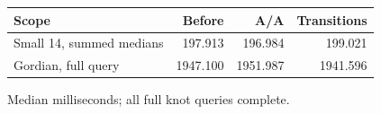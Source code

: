 \begin{center}\small
\begin{tabular}{@{}lrrr@{}}
\toprule
Scope & Before & A/A & Transitions \\
\midrule
Small 14, summed medians & 197.913 & 196.984 & 199.021 \\
Gordian, full query & 1947.100 & 1951.987 & 1941.596 \\
\bottomrule
\end{tabular}
\end{center}
Median milliseconds; all full knot queries complete.
